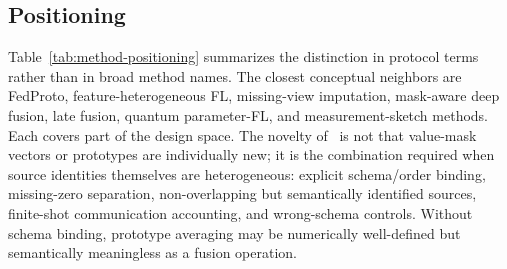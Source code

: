 

\subsection{Positioning}

Table~\ref{tab:method-positioning} summarizes the distinction in protocol terms rather than in broad method names. The closest conceptual neighbors are FedProto, feature-heterogeneous FL, missing-view imputation, mask-aware deep fusion, late fusion, quantum parameter-FL, and measurement-sketch methods. Each covers part of the design space. The novelty of \method\ is not that value-mask vectors or prototypes are individually new; it is the combination required when source identities themselves are heterogeneous: explicit schema/order binding, missing-zero separation, non-overlapping but semantically identified sources, finite-shot communication accounting, and wrong-schema controls. Without schema binding, prototype averaging may be numerically well-defined but semantically meaningless as a fusion operation.
